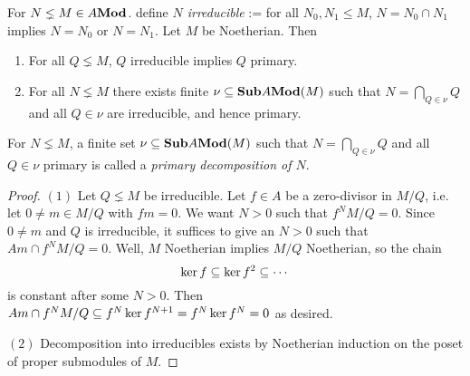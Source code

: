 \begin{prop}
  
  For $N \lneq M \in A\mathbf{Mod}$.
  define \textit{$N$ irreducible} := 
  for all $N_0, N_1 \leq M$, $N = N_0 \cap N_1$ implies $N = N_0$ or $N = N_1$.
  Let $M$ be Noetherian. 
  Then 
  \begin{enumerate}
    \item For all $Q \lneq M$, $Q$ irreducible implies $Q$ primary. 
    \item For all $N \lneq M$
    there exists finite $\nu \subseteq \mathbf{Sub} A\mathbf{Mod}(M)$ such that 
    $N = \bigcap_{Q \in \nu} Q$ and all $Q \in \nu$ are irreducible,
    and hence primary. 
  \end{enumerate}

  For $N \lneq M$, 
  a finite set $\nu \subseteq \mathbf{Sub} A\mathbf{Mod}(M)$ such that 
  $N = \bigcap_{Q \in \nu} Q$ and all $Q \in \nu$ primary is called a 
  \textit{primary decomposition of $N$}.
\end{prop}
\begin{proof}
  $(1)$
  Let $Q \lneq M$ be irreducible.
  Let $f \in A$ be a zero-divisor in $M/Q$, 
  i.e. let $0 \neq m \in M/Q$ with $f m = 0$.
  We want $N > 0$ such that $f^N M/Q = 0$.
  Since $0 \neq m$ and $Q$ is irreducible, 
  it suffices to give an $N > 0$ such that $Am \cap f^N M/Q = 0$.
  Well, $M$ Noetherian implies $M/Q$ Noetherian, so the chain 
  \[
    \ker f \subseteq \ker f^2 \subseteq \cdots 
  \]
  is constant after some $N > 0$.
  Then $Am \cap f^N M/Q \subseteq f^N \ker f^{N+1} = f^N \ker f^N = 0$ as desired.

  $(2)$
  Decomposition into irreducibles exists by Noetherian induction
  on the poset of proper submodules of $M$.

\end{proof}

